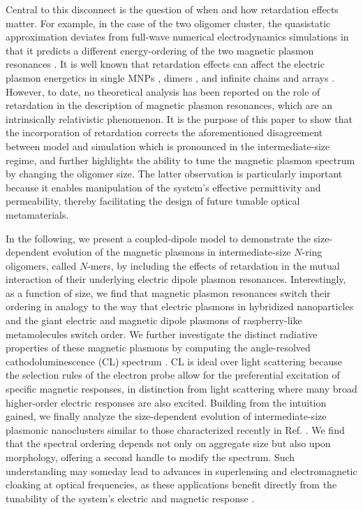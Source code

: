 \documentclass [11pt, proquest] {uwthesis}[2016/11/22]
\begin{document}
Central to this disconnect is the question of when and how retardation effects matter. For example, in the case of the two oligomer cluster, the quasistatic approximation deviates from full-wave numerical electrodynamics simulations in that it predicts a different energy-ordering of the two magnetic plasmon resonances \cite{Cherqui2014}. It is well known that retardation effects can affect the electric plasmon energetics in single MNPs \cite{Gu2010}, dimers \cite{Oubre2004,vonPlessen2007}, and infinite chains and arrays \cite{Lucas1976,ARAVIND1981,Kottman2001,Schatz2003,NordHal2003,NordProdan2004,Rechbacher2003,Schatz2003,Royer2005,Abajo2008,Gomez2009,Chumanov2010,Pinchuk2016}. However, to date, no theoretical analysis has been reported on the role of retardation in the description of magnetic plasmon resonances, which are an intrinsically relativistic phenomenon. It is the purpose of this paper to show that the incorporation of retardation corrects the aforementioned disagreement between model and simulation which is pronounced in the intermediate-size regime, and further highlights the ability to tune the magnetic plasmon spectrum by changing the oligomer size. The latter observation is particularly important because it enables manipulation of the system's effective permittivity and permeability, thereby facilitating the design of future tunable optical metamaterials.



In the following, we present a coupled-dipole model to demonstrate the size-dependent evolution of the magnetic plasmons in intermediate-size $N$-ring oligomers, called $N$-mers, by including the effects of retardation in the mutual interaction of their underlying electric dipole plasmon resonances. Interestingly, as a function of size, we find that magnetic plasmon resonances switch their ordering in analogy to the way that electric plasmons in hybridized nanoparticles \cite{vonPlessen2007} and the giant electric and magnetic dipole plasmons of raspberry-like metamolecules \cite{Fakhraai2018} switch order. We further investigate the distinct radiative properties of these magnetic plasmons by computing the angle-resolved cathodoluminescence (CL) spectrum \cite{Hohenester2012,Hohenester2014,Coenen2011,CoPol2011,Polman2014}. CL is ideal over light scattering because the selection rules of the electron probe allow for the preferential excitation of specific magnetic responses, in distinction from light scattering where many broad higher-order electric responses are also excited. Building from the intuition gained, we finally analyze the size-dependent evolution of intermediate-size plasmonic nanoclusters similar to those characterized recently in Ref. \cite{Engheta2017}. We find that the spectral ordering depends not only on aggregate size but also upon morphology, offering a second handle to modify the spectrum. Such understanding may someday lead to advances in superlensing and electromagnetic cloaking at optical frequencies, as these applications benefit directly from the tunability of the system's electric and magnetic response \cite{Pendry03,Fang2005,Cai2007,Pinchuk07,Shalaev2008,Valentine2008,Ferrari09,Tian2018}.
\end{document}
